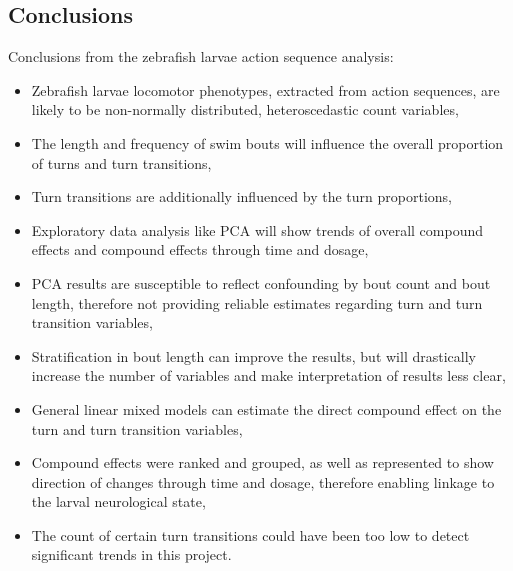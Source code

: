 \documentclass[a4paper,12pt]{article}
\begin{document}
\subsection{Conclusions}
Conclusions from the zebrafish larvae action sequence analysis:
\begin{itemize}
  \item Zebrafish larvae locomotor phenotypes, extracted from action sequences, are likely to be non-normally distributed, heteroscedastic count variables,
  \item The length and frequency of swim bouts will influence the overall proportion of turns and turn transitions, 
  \item Turn transitions are additionally influenced by the turn proportions,
  \item Exploratory data analysis like PCA will show trends of overall compound effects and compound effects through time and dosage, 
  \item PCA results are susceptible to reflect confounding by bout count and bout length, therefore not providing reliable estimates regarding turn and turn transition variables, 
  \item Stratification in bout length can improve the results, but will drastically increase the number of variables and make interpretation of results less clear,
  \item General linear mixed models can estimate the direct compound effect on the turn and turn transition variables,
  \item Compound effects were ranked and grouped, as well as represented to show direction of changes through time and dosage, therefore enabling linkage to the larval neurological state,
  \item The count of certain turn transitions could have been too low to detect significant trends in this project.
\end{itemize}
\newpage
\end{document}
